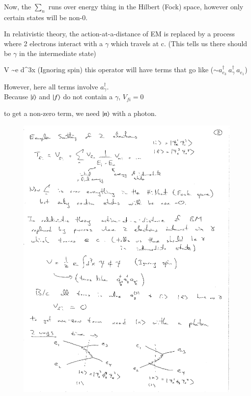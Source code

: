 {Now, the $\sum_n$ runs over energy thing in the Hilbert (Fock) space, however only certain states will be non-0.

In relativistic theory, the action-at-a-distance of EM is replaced by a process where 2 electrons interact with a $\gamma$ which travels at c. 
(This tells us there should be $\gamma$ in the intermediate state)


\be
V \sim e \int d^3x \psi \phi \psi  \hspace*{0.3in} \textrm{(Ignoring spin)}
\ee
this operator will have terms that go like ($\sim a_{e_3}^\dagger\ a_{\gamma}^\dagger\ a_{e_1}$)


However, here all terms involve $a_{\gamma}^\dagger$.\\
Because $\ket{i}$ and $\ket{f}$ do not contain a $\gamma$, $  V_{fi} = 0$

to get a non-zero term, we need $\ket{n}$ with a photon. 
\begin{figure}[h]
\centering
\includegraphics[width=0.99\textwidth]{./eeScattering.pdf}
\end{figure}





}


